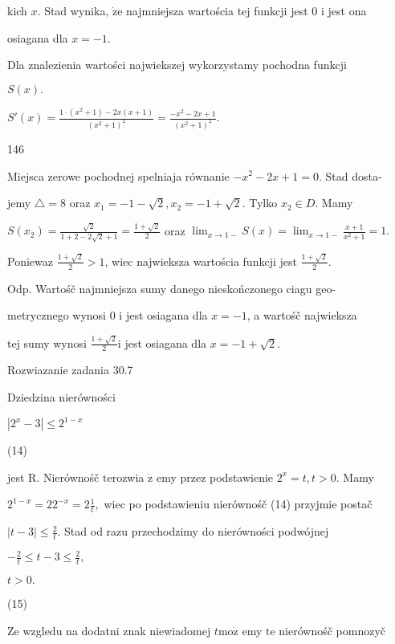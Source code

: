 \documentclass[a4paper,12pt]{article}
\begin{document}
kich $x$. Stad wynika, $\dot{\mathrm{z}}\mathrm{e}$ najmniejsza wartościa tej funkcji jest 0 $\mathrm{i}$ jest ona

osiagana dla $x=-1.$

Dla znalezienia wartości najwiekszej wykorzystamy pochodna funkcji

$S(x).$

$S'(x)=\displaystyle \frac{1\cdot(x^{2}+1)-2x(x+1)}{(x^{2}+1)^{2}}=\frac{-x^{2}-2x+1}{(x^{2}+1)^{2}}.$





146

Miejsca zerowe pochodnej spelniaja równanie $-x^{2}-2x+1=0$. Stad dosta-

jemy $\triangle= 8$ oraz $x_{1} = -1-\sqrt{2}, x_{2} = -1+\sqrt{2}$. Tylko $x_{2} \in D$. Mamy

$S(x_{2}) = \displaystyle \frac{\sqrt{2}}{1+2-2\sqrt{2}+1} = \displaystyle \frac{1+\sqrt{2}}{2}$ oraz $\displaystyle \lim_{x\rightarrow 1-}S(x) = \displaystyle \lim_{x\rightarrow 1-}\frac{x+1}{x^{2}+1} = 1.$

Poniewaz $\displaystyle \frac{1+\sqrt{2}}{2}>1$, wiec najwieksza wartościa funkcji jest $\displaystyle \frac{1+\sqrt{2}}{2}.$

Odp. Wartośč najmniejsza sumy danego nieskończonego ciagu geo-

metrycznego wynosi 0 $\mathrm{i}$ jest osiagana dla $x = -1$, a wartośč najwieksza

tej sumy wynosi $\displaystyle \frac{1+\sqrt{2}}{2}\mathrm{i}$ jest osiagana dla $x=-1+\sqrt{2}.$

Rozwiazanie zadania 30.7

Dziedzina nierówności

$|2^{x}-3|\leq 2^{1-x}$

(14)

jest R. Nierównośč $\mathrm{t}\mathrm{e}\mathrm{r}$ozwia $\dot{\mathrm{z}}$ emy przez podstawienie $2^{x}=t, t>0$. Mamy

$2^{1-x}=22^{-x}=2\displaystyle \frac{1}{t},$ wiec po podstawieniu nierównośč (14) przyjmie postač

$|t-3|\displaystyle \leq\frac{2}{t}$. Stad od razu przechodzimy do nierówności podwójnej

$-\displaystyle \frac{2}{t}\leq t-3\leq\frac{2}{t},$

$t>0.$

(15)

Ze wzgledu na dodatni znak niewiadomej $t \mathrm{m}\mathrm{o}\dot{\mathrm{z}}$ emy $\mathrm{t}\mathrm{e}$ nierównośč pomnozyč
\end{document}
